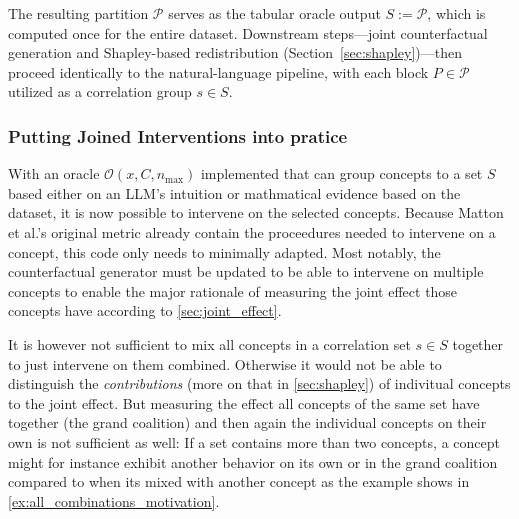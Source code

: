 The resulting partition $\mathcal{P}$ serves as the tabular oracle output $S := \mathcal{P}$, which is computed once for the entire dataset. Downstream steps—joint counterfactual generation and Shapley-based redistribution (Section~\ref{sec:shapley})—then proceed identically to the natural-language pipeline, with each block $P \in \mathcal{P}$ utilized as a correlation group $s \in S$.
 
\subsubsection{Putting Joined Interventions into pratice}
With an oracle $\mathcal{O}(x, C, n_{\max})$ implemented that can group concepts to a set $S$ based either on an LLM's intuition or mathmatical evidence based on the dataset, it is now possible to intervene on the selected concepts. Because Matton et al.'s original metric already contain the proceedures needed to intervene on a concept, this code only needs to minimally adapted. Most notably, the counterfactual generator must be updated to be able to intervene on multiple concepts to enable the major rationale of measuring the joint effect those concepts have according to \ref{sec:joint_effect}.

It is however not sufficient to mix all concepts in a correlation set $s \in S$ together to just intervene on them combined. Otherwise it would not be able to distinguish the \emph{contributions} (more on that in \ref{sec:shapley}) of indivitual concepts to the joint effect. But measuring the effect all concepts of the same set have together (the grand coalition) and then again the individual concepts on their own is not sufficient as well: If a set contains more than two concepts, a concept might for instance exhibit another behavior on its own or in the grand coalition compared to when its mixed with another concept as the example shows in \ref{ex:all_combinations_motivation}.

